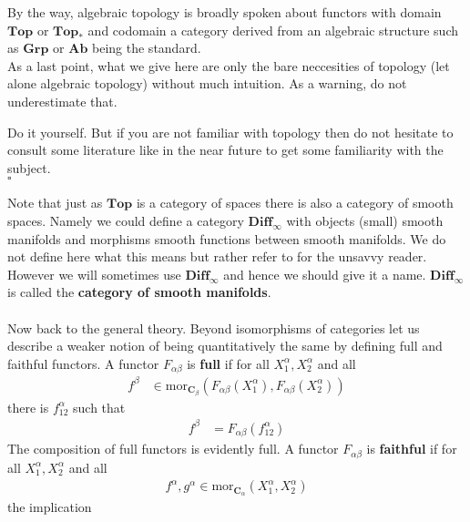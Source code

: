 \begin{exa}
\begin{enumerate}
\end{enumerate}
By the way, algebraic topology is broadly spoken about functors with domain $\mathbf{Top}$ or $\mathbf{Top}_{\ast}$ and codomain a category derived from an algebraic structure such as $\mathbf{Grp}$ or $\mathbf{Ab}$ being the standard.
\\
As a last point, what we give here are only the bare neccesities of topology (let alone algebraic topology) without much intuition. As a warning, do not underestimate that.
\end{exa}
\begin{prf}
Do it yourself. But if you are not familiar with topology then do not hesitate to consult some literature like \cite{273ba834} in the near future to get some familiarity with the subject.
\\
\phantom{proven}
\hfill
$\square$
\end{prf}
Note that just as $\mathbf{Top}$ is a category of spaces there is also a category of {\glqq}smooth spaces{\grqq}. Namely we could define a category $\mathbf{Diff}_{\infty}$ with objects (small) smooth manifolds and morphisms smooth functions between smooth manifolds. We do not define here what this means but rather refer to \cite{797789bc} for the unsavvy reader. However we will sometimes use $\mathbf{Diff}_{\infty}$ and hence we should give it a name. $\mathbf{Diff}_{\infty}$ is called the \textbf{category of smooth manifolds}.
\\\\
Now back to the general theory. Beyond isomorphisms of categories let us describe a weaker notion of being quantitatively the same by defining full and faithful functors. A functor $F_{\alpha\beta}$ is \textbf{full} if for all $X_{1}^{\alpha},X_{2}^{\alpha}$ and all
\begin{align*}
  f^{\beta}
  &\in
  \mathrm{mor}_{\mathbf{C}_{\beta}}
  (F_{\alpha\beta}(X_{1}^{\alpha}),F_{\alpha\beta}(X_{2}^{\alpha}))
\end{align*}
there is $f_{12}^{\alpha}$ such that
\begin{align*}
  f^{\beta}
  &=
  F_{\alpha\beta}(f_{12}^{\alpha})
\end{align*}
The composition of full functors is evidently full. A functor $F_{\alpha\beta}$ is \textbf{faithful} if for all $X_{1}^{\alpha},X_{2}^{\alpha}$ and all
\begin{align*}
  f^{\alpha},g^{\alpha}
  \in
  \mathrm{mor}_{\mathbf{C}_{\alpha}}(X_{1}^{\alpha},X_{2}^{\alpha})
\end{align*}
the implication
